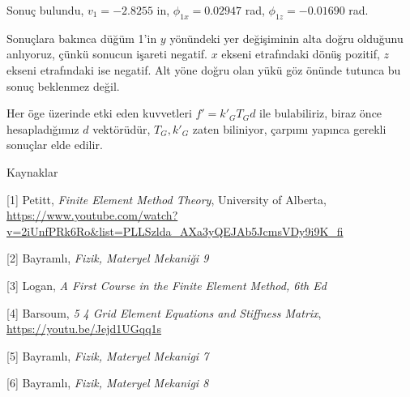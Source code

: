 \documentclass[12pt,fleqn]{article}\usepackage{../../common}
\begin{document}
Sonuç bulundu, $v_1 = -2.8255$ in, $\phi_{1x} = 0.02947$ rad, $\phi_{1z} =
-0.01690$ rad.

Sonuçlara bakınca düğüm 1'in $y$ yönündeki yer değişiminin alta doğru olduğunu
anlıyoruz, çünkü sonucun işareti negatif. $x$ ekseni etrafındaki dönüş pozitif,
$z$ ekseni etrafındaki ise negatif. Alt yöne doğru olan yükü göz önünde tutunca
bu sonuç beklenmez değil.

Her öge üzerinde etki eden kuvvetleri $f' = k'_G T_G d$ ile bulabiliriz, biraz
önce hesapladığımız $d$ vektörüdür, $T_G,k'_G$ zaten biliniyor, çarpımı yapınca
gerekli sonuçlar elde edilir.

Kaynaklar

[1] Petitt, {\em Finite Element Method Theory}, University of Alberta,
    \url{https://www.youtube.com/watch?v=2iUnfPRk6Ro&list=PLLSzlda_AXa3yQEJAb5JcmsVDy9i9K_fi}

[2] Bayramlı, {\em Fizik, Materyel Mekaniği 9}

[3] Logan, {\em A First Course in the Finite Element Method, 6th Ed}

[4] Barsoum, {\em 5 4 Grid Element Equations and Stiffness Matrix},
    \url{https://youtu.be/Jejd1UGqq1s}

[5] Bayramlı, {\em Fizik, Materyel Mekanigi 7}

[6] Bayramlı, {\em Fizik, Materyel Mekanigi 8}
\end{document}
